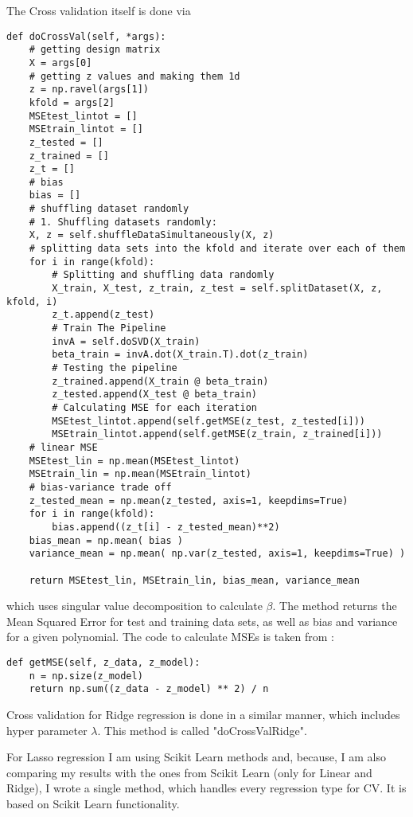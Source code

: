 The Cross validation itself is done via
\begin{lstlisting}
def doCrossVal(self, *args):
    # getting design matrix
    X = args[0]
    # getting z values and making them 1d
    z = np.ravel(args[1])
    kfold = args[2]
    MSEtest_lintot = []
    MSEtrain_lintot = []
    z_tested = []
    z_trained = []
    z_t = []
    # bias
    bias = []
    # shuffling dataset randomly
    # 1. Shuffling datasets randomly:
    X, z = self.shuffleDataSimultaneously(X, z)
    # splitting data sets into the kfold and iterate over each of them
    for i in range(kfold):
        # Splitting and shuffling data randomly
        X_train, X_test, z_train, z_test = self.splitDataset(X, z, kfold, i)
        z_t.append(z_test)
        # Train The Pipeline
        invA = self.doSVD(X_train)
        beta_train = invA.dot(X_train.T).dot(z_train)
        # Testing the pipeline
        z_trained.append(X_train @ beta_train)
        z_tested.append(X_test @ beta_train)
        # Calculating MSE for each iteration
        MSEtest_lintot.append(self.getMSE(z_test, z_tested[i]))
        MSEtrain_lintot.append(self.getMSE(z_train, z_trained[i]))
    # linear MSE
    MSEtest_lin = np.mean(MSEtest_lintot)
    MSEtrain_lin = np.mean(MSEtrain_lintot)
    # bias-variance trade off
    z_tested_mean = np.mean(z_tested, axis=1, keepdims=True)
    for i in range(kfold):
        bias.append((z_t[i] - z_tested_mean)**2)
    bias_mean = np.mean( bias )
    variance_mean = np.mean( np.var(z_tested, axis=1, keepdims=True) )

    return MSEtest_lin, MSEtrain_lin, bias_mean, variance_mean
\end{lstlisting}
which uses singular value decomposition to calculate $\beta$. The method returns the Mean Squared Error for test and training data sets, as well as bias and variance for a given polynomial. The code to calculate MSEs is taken from \cite{Morten}:
\begin{lstlisting}
def getMSE(self, z_data, z_model):
    n = np.size(z_model)
    return np.sum((z_data - z_model) ** 2) / n
\end{lstlisting}
Cross validation for Ridge regression is done in a similar manner, which includes hyper parameter $\lambda$. This method is called "doCrossValRidge".

For Lasso regression I am using Scikit Learn methods and, because, I am also comparing my results with the ones from Scikit Learn (only for Linear and Ridge), I wrote a single method, which handles every regression type for CV. It is based on Scikit Learn functionality. 

